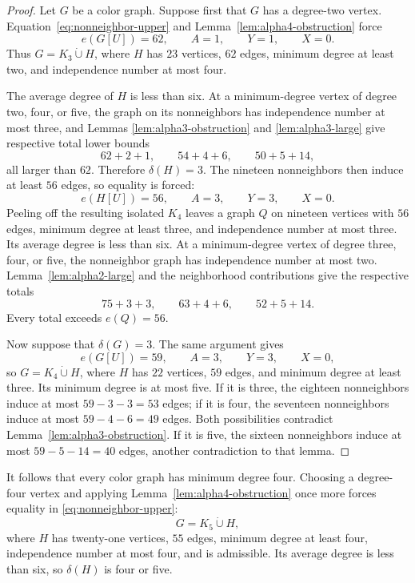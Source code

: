 \documentclass[11pt,reqno,a4paper]{amsart}
\theoremstyle{definition}
\theoremstyle{remark}
\begin{document}
\begin{proof}
Let $G$ be a color graph.  Suppose first that $G$ has a degree-two vertex.
Equation~\eqref{eq:nonneighbor-upper} and
Lemma~\ref{lem:alpha4-obstruction} force
\[
  e(G[U])=62,\qquad A=1,\qquad Y=1,\qquad X=0.
\]
Thus $G=K_3\mathbin{\dot\cup}H$, where $H$ has $23$ vertices, $62$ edges,
minimum degree at least two, and independence number at most four.

The average degree of $H$ is less than six.  At a minimum-degree vertex of
degree two, four, or five, the graph on its nonneighbors has independence
number at most three, and Lemmas \ref{lem:alpha3-obstruction} and
\ref{lem:alpha3-large} give respective total lower bounds
\[
  62+2+1,\qquad 54+4+6,\qquad 50+5+14,
\]
all larger than $62$.  Therefore $\delta(H)=3$.  The nineteen nonneighbors
then induce at least $56$ edges, so equality is forced:
\[
  e(H[U])=56,\qquad A=3,\qquad Y=3,\qquad X=0.
\]
Peeling off the resulting isolated $K_4$ leaves a graph $Q$ on nineteen
vertices with $56$ edges, minimum degree at least three, and independence
number at most three.  Its average degree is less than six.  At a
minimum-degree vertex of degree three, four, or five, the nonneighbor graph
has independence number at most two.  Lemma~\ref{lem:alpha2-large} and the
neighborhood contributions give the respective totals
\[
  75+3+3,\qquad 63+4+6,\qquad 52+5+14.
\]
Every total exceeds $e(Q)=56$.

Now suppose that $\delta(G)=3$.  The same argument gives
\[
  e(G[U])=59,\qquad A=3,\qquad Y=3,\qquad X=0,
\]
so $G=K_4\mathbin{\dot\cup}H$, where $H$ has $22$ vertices, $59$ edges,
and minimum degree at least three.  Its minimum degree is at most five.  If
it is three, the eighteen nonneighbors induce at most
$59-3-3=53$ edges; if it is four, the seventeen nonneighbors induce at
most $59-4-6=49$ edges.  Both possibilities contradict
Lemma~\ref{lem:alpha3-obstruction}.  If it is five, the sixteen
nonneighbors induce at most $59-5-14=40$ edges, another contradiction to
that lemma.
\end{proof}

It follows that every color graph has minimum degree four.  Choosing a
degree-four vertex and applying Lemma~\ref{lem:alpha4-obstruction} once
more forces equality in \eqref{eq:nonneighbor-upper}:
\begin{equation}\label{eq:K5H}
  G=K_5\mathbin{\dot\cup}H,
\end{equation}
where $H$ has twenty-one vertices, $55$ edges, minimum degree at least four,
independence number at most four, and is admissible.  Its average degree is
less than six, so $\delta(H)$ is four or five.
\end{document}
